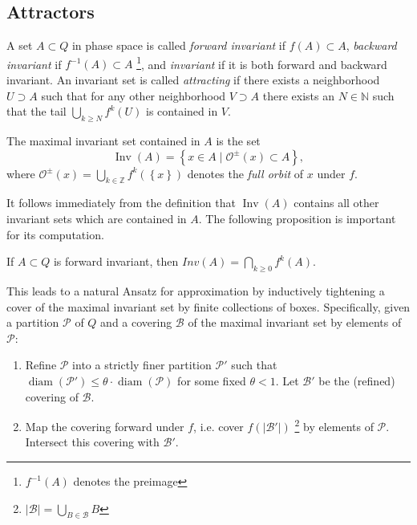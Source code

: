 \documentclass{juliacon}
\newcommand{\N}{{\mathbb N}}
\newcommand{\Z}{{\mathbb Z}}
\newcommand{\cO}{\mathcal{O}}
\newcommand{\cB}{\mathcal{B}}
\newcommand{\cP}{\mathcal{P}}
\newcommand{\Inv}{\mathop{\mathrm{Inv}}}
\newcommand{\diam}{\mathop{\mathrm{diam}}}
\begin{document}
\subsection{Attractors}\label{sec:attractors}

A set $A \subset Q$ in phase space is called \emph{forward invariant} if $f(A) \subset A$, \emph{backward invariant} if $f^{-1}(A) \subset A$ \footnote{$f^{-1}(A)$ denotes the preimage}, and \emph{invariant} if it is both forward and backward invariant. An invariant set is called \emph{attracting} if there exists a neighborhood $U \supset A$ such that for any other neighborhood $V \supset A$ there exists an $N \in \N$ such that the tail $\bigcup_{k \geq N} f^k (U)$ is contained in $V$. 

\begin{defi}
    The maximal invariant set contained in $A$ is the set 
    \begin{equation}
        \Inv (A) = \left\{ x \in A \mid \cO^\pm (x) \subset A \right\},
    \end{equation}
    where $\cO^\pm (x) = \bigcup_{k \in \Z} f^{k}(\left\{ x \right\})$ denotes the \emph{full orbit} of $x$ under $f$. 
\end{defi}

It follows immediately from the definition that $\Inv (A)$ contains all other invariant sets which are contained in $A$. The following proposition is important for its computation. 

\begin{proposition}
    \cite{maxinvset}
    If $A \subset Q$ is forward invariant, then $Inv (A) = \bigcap_{k \geq 0} f^k (A)$. 
\end{proposition}

This leads to a natural Ansatz for approximation by inductively tightening a cover of the maximal invariant set by finite collections of boxes. Specifically, given a partition $\cP$ of $Q$ and a covering $\cB$ of the maximal invariant set by elements of $\cP$:

\begin{enumerate}
    \item Refine $\cP$ into a strictly finer partition $\cP'$ such that $\diam (\cP') \leq \theta \cdot \diam (\cP)$ for some fixed $\theta < 1$. Let $\cB'$ be the (refined) covering of $\cB$. 
    \item Map the covering forward under $f$, i.e. cover $f(\vert\cB'\vert)$ \footnote{$\vert \cB \vert = \bigcup_{B \in \cB} B$} by elements of $\cP$. Intersect this covering with $\cB'$. 
\end{enumerate}
\end{document}
